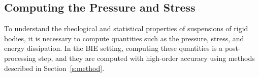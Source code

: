 \documentclass[preprint, 10pt]{elsarticle}
\begin{document}
%
%

\subsection{Computing the Pressure and Stress}
To understand the rheological and statistical properties of suspensions
of rigid bodies, it is necessary to compute quantities such as the
pressure, stress, and energy dissipation.  In the BIE setting, computing
these quantities is a post-processing step, and they are 
computed with high-order accuracy using methods described in
Section~\ref{s:method}.
\end{document}
